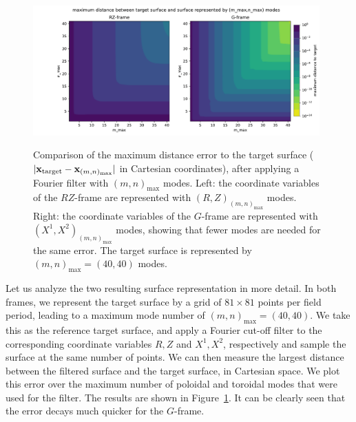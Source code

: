 \documentclass[12pt]{iopart}
\newcommand\hladdedrev[1]{#1} %
\newcommand\GFF{$G$-frame}
\newcommand\RZF{$RZ$-frame}
\begin{document}
\begin{figure}[htbp!]
    \centering
    \includegraphics[trim=40 10 0 20,clip,width=0.98\textwidth]{pics/quasr/quasr_spectrum_vs_accuracy_comparison.pdf}\\
    \caption{\hladdedrev{Comparison of the maximum distance error to the target surface ($|{\bf x}_\text{target}-{\bf x}_{(m,n)_\text{max}}|$ in Cartesian coordinates), after applying a Fourier filter with $(m,n)_\text{max}$ modes. Left:  the coordinate variables of the \RZF{} are represented with $(R,Z)_{(m,n)_\text{max}}$ modes. Right:  the coordinate variables of the \GFF{} are represented with $(X^1,X^2)_{(m,n)_\text{max}}$  modes, showing that fewer modes are needed for the same error. The target surface is represented by  $(m,n)_\text{max}=(40,40)$ modes. }}
    \label{fig:quasr_spectrum_vs_accuracy}
\end{figure}


\hladdedrev{Let us analyze the two resulting surface representation in more detail. In both frames, we represent the target surface by a grid of $81 \times 81$ points per field period, leading to a maximum mode number of $(m,n)_\text{max}=(40,40)$.
We take this as the reference target surface, and apply a Fourier cut-off filter to the corresponding coordinate variables $R,Z$ and $X^1,X^2$, respectively and sample the surface at the same number of points. We can then measure the largest distance between the filtered surface and the target surface, in Cartesian space. We plot this error over the maximum number of poloidal and toroidal modes that were used for the filter. The results are shown in Figure~\ref{fig:quasr_spectrum_vs_accuracy}. It can be clearly seen that the error decays much quicker for the \GFF{}. 
}
\end{document}

